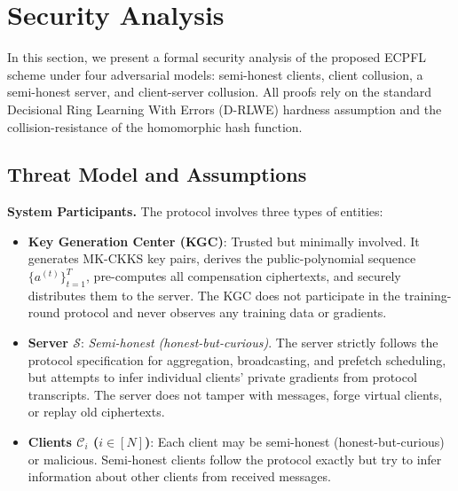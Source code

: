 \section{Security Analysis}
\label{sec:security}

In this section, we present a formal security analysis of the proposed \textsc{ECPFL} scheme under four adversarial models: semi-honest clients, client collusion, a semi-honest server, and client-server collusion. All proofs rely on the standard Decisional Ring Learning With Errors (D-RLWE) hardness assumption and the collision-resistance of the homomorphic hash function.

\subsection{Threat Model and Assumptions}
\label{ssec:threat-model}

\noindent\textbf{System Participants.}
The protocol involves three types of entities:
\begin{itemize}
    \item \textbf{Key Generation Center (KGC)}: Trusted but minimally involved. It generates MK-CKKS key pairs, derives the public-polynomial sequence $\{a^{(t)}\}_{t=1}^{T}$, pre-computes all compensation ciphertexts, and securely distributes them to the server. The KGC does not participate in the training-round protocol and never observes any training data or gradients.
    \item \textbf{Server $\mathcal{S}$}: \emph{Semi-honest (honest-but-curious)}. The server strictly follows the protocol specification for aggregation, broadcasting, and prefetch scheduling, but attempts to infer individual clients' private gradients from protocol transcripts. The server does not tamper with messages, forge virtual clients, or replay old ciphertexts.
    \item \textbf{Clients $\mathcal{C}_i$ ($i \in [N]$)}: Each client may be semi-honest (honest-but-curious) or malicious. Semi-honest clients follow the protocol exactly but try to infer information about other clients from received messages.
\end{itemize}

